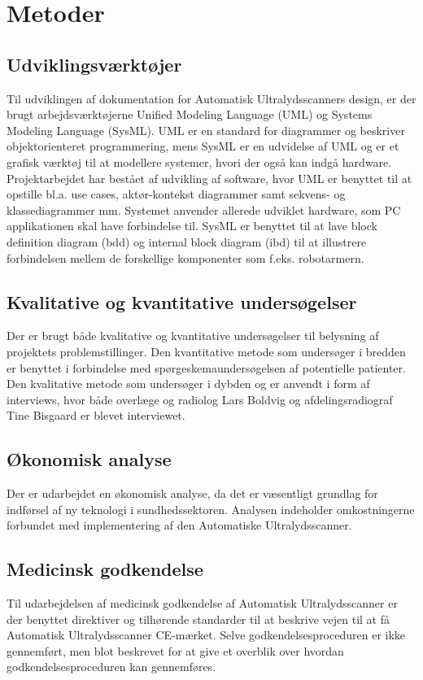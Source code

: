 \chapter{Metoder}\label{Metoder}

\section{Udviklingsværktøjer} 
Til udviklingen af dokumentation for Automatisk Ultralydsscanners design, er der brugt arbejdsværktøjerne Unified Modeling Language (UML) og Systems Modeling Language (SysML). UML er en standard for diagrammer og beskriver objektorienteret programmering, mens SysML er en udvidelse af UML og er et grafisk værktøj til at modellere systemer, hvori der også kan indgå hardware. Projektarbejdet har bestået af udvikling af software, hvor  UML er benyttet til at opstille bl.a. use cases, aktør-kontekst diagrammer samt sekvens- og klassediagrammer mm. Systemet anvender allerede udviklet hardware, som PC applikationen skal have forbindelse til. SysML er benyttet til at lave block definition diagram (bdd) og internal block diagram (ibd) til at illustrere forbindelsen mellem de forskellige komponenter som f.eks. robotarmern. \cite{UML} \cite{SysML}

\section{Kvalitative og kvantitative undersøgelser}
Der er brugt både kvalitative og kvantitative undersøgelser til belysning af projektets problemstillinger. Den kvantitative metode som undersøger i bredden er benyttet i forbindelse med spørgeskemaundersøgelsen af potentielle patienter. Den kvalitative metode som undersøger i dybden og er anvendt i form af interviews, hvor både overlæge og radiolog Lars Boldvig og afdelingsradiograf Tine Bisgaard er blevet interviewet. 

\section{Økonomisk analyse}
Der er udarbejdet en økonomisk analyse, da det er væsentligt grundlag for indførsel af ny teknologi i sundhedssektoren. Analysen indeholder omkostningerne forbundet med implementering af den Automatiske Ultralydsscanner. 

\section{Medicinsk godkendelse}
Til udarbejdelsen af medicinsk godkendelse af Automatisk Ultralydsscanner er der benyttet direktiver og tilhørende standarder til at beskrive vejen til at få Automatisk Ultralydsscanner CE-mærket. Selve godkendelsesproceduren er ikke gennemført, men blot beskrevet for at give et overblik over hvordan godkendelsesproceduren kan gennemføres. 